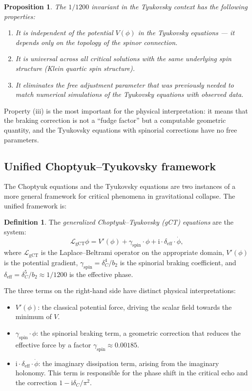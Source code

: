 \documentclass[12pt,a4paper]{article}
\newtheorem{proposition}[theorem]{Proposition}
\theoremstyle{definition}
\newtheorem{definition}[theorem]{Definition}
\theoremstyle{remark}
\newcommand{\cL}{\mathcal{L}}
\newcommand{\ii}{\mathrm{i}}
\begin{document}
\begin{proposition}
The $1/1200$ invariant in the Tyukovsky context has the following properties:
\begin{enumerate}[label=(\roman*)]
\item It is independent of the potential $V(\phi)$ in the Tyukovsky equations --- it depends only on the topology of the spinor connection.
\item It is universal across all critical solutions with the same underlying spin structure (Klein quartic spin structure).
\item It eliminates the free adjustment parameter that was previously needed to match numerical simulations of the Tyukovsky equations with observed data.
\end{enumerate}
\end{proposition}

Property (iii) is the most important for the physical interpretation: it means that the braking correction is not a ``fudge factor'' but a computable geometric quantity, and the Tyukovsky equations with spinorial corrections have no free parameters.

\subsection{Unified Choptyuk--Tyukovsky framework}

The Choptyuk equations and the Tyukovsky equations are two instances of a more general framework for critical phenomena in gravitational collapse. The unified framework is:

\begin{definition}
The \emph{generalized Choptyuk--Tyukovsky (gCT) equations} are the system:
\begin{equation}
\cL_{\mathrm{gCT}} \phi = V'(\phi) + \gamma_{\mathrm{spin}} \cdot \phi + \ii \cdot \delta_{\mathrm{eff}} \cdot \dot\phi,
\end{equation}
where $\cL_{\mathrm{gCT}}$ is the Laplace--Beltrami operator on the appropriate domain, $V'(\phi)$ is the potential gradient, $\gamma_{\mathrm{spin}} = \delta_C^4/b_2$ is the spinorial braking coefficient, and $\delta_{\mathrm{eff}} = \delta_C^5/b_2 \approx 1/1200$ is the effective phase.
\end{definition}

The three terms on the right-hand side have distinct physical interpretations:
\begin{itemize}
\item $V'(\phi)$: the classical potential force, driving the scalar field towards the minimum of $V$.
\item $\gamma_{\mathrm{spin}} \cdot \phi$: the spinorial braking term, a geometric correction that reduces the effective force by a factor $\gamma_{\mathrm{spin}} \approx 0.00185$.
\item $\ii \cdot \delta_{\mathrm{eff}} \cdot \dot\phi$: the imaginary dissipation term, arising from the imaginary holonomy. This term is responsible for the phase shift in the critical echo and the correction $1 - \ii\delta_C/\pi^2$.
\end{itemize}
\end{document}
